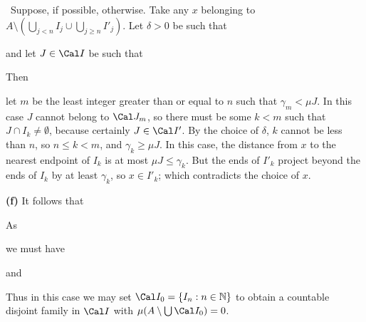 {

\noindent\Prf\Quer\ Suppose, if possible, otherwise.   Take
any $x$ belonging to
$A\setminus(\bigcup_{j<n}{I}_j\cup\bigcup_{j\ge n}I'_j)$.   Let
$\delta>0$ be such that



\noindent and let $J\in\Cal I$ be such that


\noindent   Then


\noindent  let $m$ be the least integer
greater than or equal to $n$ such that $\gamma_m<\mu J$.   In this case
$J$ cannot belong to $\Cal J_m$, so there must be some $k<m$ such that
$J\cap I_k\ne\emptyset$, because certainly $J\in\Cal I'$.   By the
choice of $\delta$, $k$ cannot be less than $n$, so $n\le k<m$, and
$\gamma_k\ge\mu J$.   In this case, the distance from $x$ to the nearest
endpoint of $I_k$ is at most $\mu J\le \gamma_k$.   But the ends of
$I'_k$ project beyond the ends of $I_k$ by at least $\gamma_k$, so $x\in
I'_k$;  which contradicts the choice of $x$. \Bang \Qed

\medskip

{\bf (f)} It follows that


\noindent As


\noindent we must have


\noindent and


Thus in this case we may set $\Cal I_0=\{I_n:n\in\Bbb N\}$ to obtain
a countable disjoint family in $\Cal I$ with
$\mu(A\setminus\bigcup\Cal I_0)=0$.
}%

